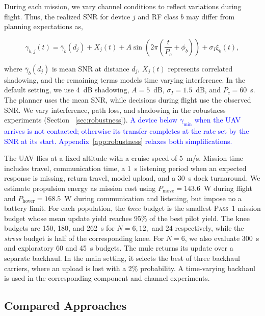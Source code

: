 \documentclass[conference]{IEEEtran}
\begin{document}
During each mission, we vary channel conditions to reflect variations during flight. Thus, the realized SNR for device 
 \(j\)  and RF class 
\(b\) may differ from planning expectations as,

\begin{equation}
\gamma_{b,j}(t)
=
\bar{\gamma}_{b}(d_j)
+
X_j(t)
+
A\sin\!\left(2\pi\left(\frac{t}{P_c}+\phi_b\right)\right)
+
\sigma_I\xi_b(t),
\label{eq:channel-model}
\end{equation}

where \(\bar{\gamma}_{b}(d_j)\) is mean SNR at distance \(d_j\),
\(X_j(t)\) represents correlated shadowing, and the remaining terms models
time varying interference. In the default setting, we use 4~dB shadowing,
\(A=5\)~dB, \(\sigma_I=1.5\)~dB, and \(P_c=60\)~s. The planner uses the
mean SNR, while decisions during flight use the observed SNR. We vary
interference, path loss, and shadowing in the robustness experiments (Section ~\ref{sec:robustness}).
\textcolor{blue}{A device below $\gamma_{\min}$ when the UAV arrives is not
contacted; otherwise its transfer completes at the rate set by the SNR at its
start. Appendix~\ref{app:robustness} relaxes both simplifications.}

The UAV flies at a fixed altitude with a cruise speed of 5~m/s. Mission time
includes travel, communication time, a 1~s listening period when an expected
response is missing, return travel, model upload, and a 30~s dock turnaround.
We estimate propulsion energy as mission cost using
\(P_{\mathrm{move}}=143.6\)~W during flight and
\(P_{\mathrm{hover}}=168.5\)~W during communication and listening, but impose no a battery limit. For each population, the \emph{knee} budget is the smallest \textsc{Pass~1} mission
budget whose mean update yield reaches 95\% of the best pilot yield. The knee
budgets are 150, 180, and 262~s for \(N=6,12,\) and \(24\) respectively, while the
\emph{stress} budget is half of the corresponding knee. For \(N=6\), we also
evaluate 300~s and exploratory 60 and 45~s budgets. The mule returns its update over a separate backhaul. In the main setting, it
selects the best of three backhaul carriers, where an upload is lost with a 2\% probability. A
time-varying backhaul is used in the corresponding component and channel
experiments.

\subsection{Compared Approaches}
\label{sec:baselines}
\end{document}
